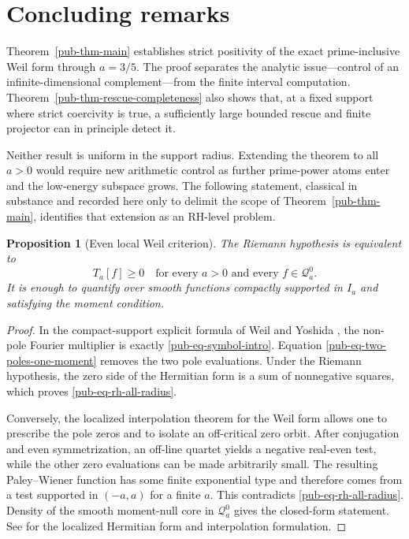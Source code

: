\documentclass[11pt]{article}
\newtheorem{proposition}[theorem]{Proposition}
\theoremstyle{remark}
\begin{document}
\section{Concluding remarks}
\label{pub-sec-conclusion}

Theorem~\ref{pub-thm-main} establishes strict positivity of the exact prime-inclusive Weil form through \(a=3/5\).
The proof separates the analytic issue---control of an infinite-dimensional complement---from the finite interval computation.
Theorem~\ref{pub-thm-rescue-completeness} also shows that,
at a fixed support where strict coercivity is true,
a sufficiently large bounded rescue and finite projector can in principle detect it.

Neither result is uniform in the support radius.
Extending the theorem to all \(a>0\) would require new arithmetic control as further prime-power atoms enter and the low-energy subspace grows.
The following statement, classical in substance and recorded here only to
delimit the scope of Theorem~\ref{pub-thm-main},
identifies that extension as an RH-level problem.

\begin{proposition}[Even local Weil criterion]
\label{pub-prop-rh-equivalence}
The Riemann hypothesis is equivalent to
\begin{equation}
 T_a[f]\geq0
 \quad\text{for every }a>0\text{ and every }f\in\mathcal Q_a^0.
 \label{pub-eq-rh-all-radius}
\end{equation}
It is enough to quantify over smooth functions compactly supported in \(I_a\) and satisfying the moment condition.
\end{proposition}

\begin{proof}
In the compact-support explicit formula of Weil and Yoshida \cite{Weil1952,Yoshida1992},
the non-pole Fourier multiplier is exactly \eqref{pub-eq-symbol-intro}.
Equation \eqref{pub-eq-two-poles-one-moment} removes the two pole evaluations.
Under the Riemann hypothesis,
the zero side of the Hermitian form is a sum of nonnegative squares,
which proves \eqref{pub-eq-rh-all-radius}.

Conversely, the localized interpolation theorem for the Weil form allows one to prescribe the pole zeros and to isolate an off-critical zero orbit.
After conjugation and even symmetrization,
an off-line quartet yields a negative real-even test,
while the other zero evaluations can be made arbitrarily small.
The resulting Paley--Wiener function has some finite exponential type and therefore comes from a test supported in \((-a,a)\) for a finite \(a\).
This contradicts \eqref{pub-eq-rh-all-radius}.
Density of the smooth moment-null core in \(\mathcal Q_a^0\) gives the closed-form statement.
See \cite{Yoshida1992,Bombieri2000} for the localized Hermitian form and interpolation formulation.
\end{proof}
\end{document}
